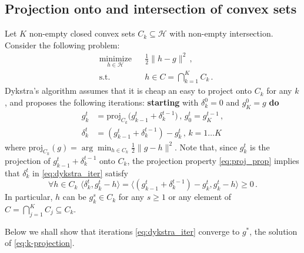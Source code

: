 \documentclass[a4paper]{article}
\newcommand{\Hcal}{\mathcal{H}}
\begin{document}

\subsection*{Projection onto and intersection of convex sets} %
\label{sub:projection_onto_and_intersection_of_convex_sets}

Let $K$ non-empty closed convex sets $C_k \subseteq \Hcal$ with non-empty intersection.
Consider the following problem:
\begin{equation} \label{eq:k-projection}  %
  \begin{aligned}
    & \underset{h \in \Hcal}{\text{minimize}}
      & & \tfrac12 \|h - g\|^2
          \,, \\
    & \text{s.t.}
      & & h \in C = \bigcap_{k=1}^K C_k
          \,.
  \end{aligned}
\end{equation}
Dykstra's algorithm assumes that it is cheap an easy to project onto $C_k$ for any $k$,
and proposes the following iterations: {\bf starting} with $\delta^0_k = 0$ and $g^0_K = g$
{\bf do}
\begin{equation} \label{eq:dykstra_iter}  %
  \begin{aligned}
    g^t_k
      &= \mathrm{proj}_{C_k}\bigl( g^t_{k-1} + \delta^{t-1}_k \bigr)
      \,,
      \, g^t_0 = g^{t-1}_K
      \,, \\
    \delta^t_k
      &= (g^t_{k-1} + \delta^{t-1}_k) - g^t_k
      \,,
      \, k = 1\ldots K
  \end{aligned}
\end{equation}
where $\mathrm{proj}_{C_k}(g) = \arg\min_{h \in C_k} \tfrac12 \|g - h\|^2$. Note
that, since $g^t_k$ is the projection of $g^t_{k-1} + \delta^{t-1}_k$ onto $C_k$,
the projection property \eqref{eq:proj_prop} implies that $\delta^t_k$ in
\eqref{eq:dykstra_iter} satisfy
\begin{equation} \label{eq:dykstra_prop}
  \forall{h\in C_k}
  \,\,
  \langle \delta^t_k, g^t_k - h \rangle
  = \bigl\langle (g^t_{k-1} + \delta^{t-1}_k) - g^t_k, g^t_k - h \bigr \rangle
  \geq 0
  \,.
\end{equation}
In particular, $h$ can be $g^s_k \in C_k$ for any $s\geq 1$ or any element of
$C = \bigcap_{j=1}^K C_j \subseteq C_k$.

Below we shall show that iterations \eqref{eq:dykstra_iter} converge to $g^*$, the
solution of \eqref{eq:k-projection}.
\end{document}
